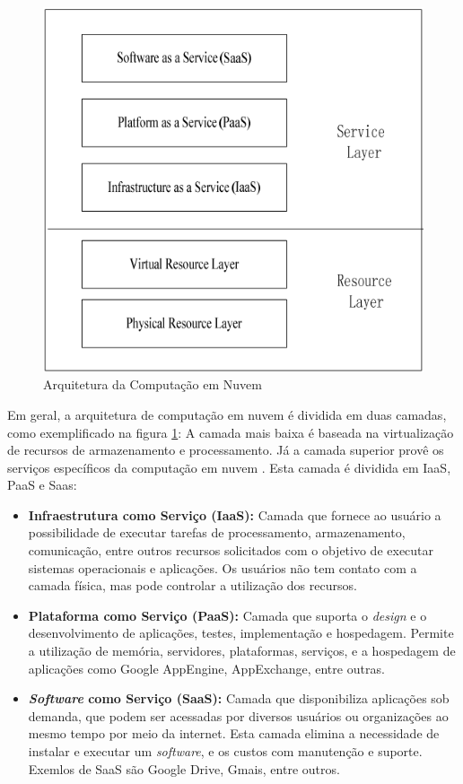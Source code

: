 \documentclass[12pt]{article}
\begin{document}
\begin{figure}[ht]
\centering
\includegraphics[scale= 0.5]{figuras/camadasCC.png}
\caption{Arquitetura da Computação em Nuvem}
\label{camadasCC}
\end{figure}

Em geral, a arquitetura de computação em nuvem é dividida em duas camadas, como
exemplificado na figura \ref{camadasCC}: A camada mais baixa é baseada na virtualização
de recursos de armazenamento e processamento. Já a camada superior provê os serviços
específicos da computação em nuvem \cite{jing2010}. Esta camada é dividida em IaaS, PaaS e Saas:

\begin{itemize}
  \item \textbf{Infraestrutura como Serviço (IaaS):} Camada que fornece ao usuário
  a possibilidade de executar tarefas de processamento, armazenamento, comunicação,
  entre outros recursos solicitados com o objetivo de executar sistemas operacionais e
  aplicações. Os usuários não tem contato com a camada física, mas pode controlar a
  utilização dos recursos.
  \item \textbf{Plataforma como Serviço (PaaS):} Camada que suporta o \textit{design}
  e o desenvolvimento de aplicações, testes, implementação e hospedagem. Permite
  a utilização de memória, servidores, plataformas, serviços, e a hospedagem de aplicações
  como Google AppEngine, AppExchange, entre outras.
  \item \textbf{\textit{Software} como Serviço (SaaS):} Camada que disponibiliza
  aplicações sob demanda, que podem ser acessadas por diversos usuários ou organizações
  ao mesmo tempo por meio da internet. Esta camada elimina a necessidade de instalar e
  executar um \textit{software}, e os custos com manutenção e suporte. Exemlos de SaaS são
  Google Drive, Gmais, entre outros.
\end{itemize}
\end{document}
